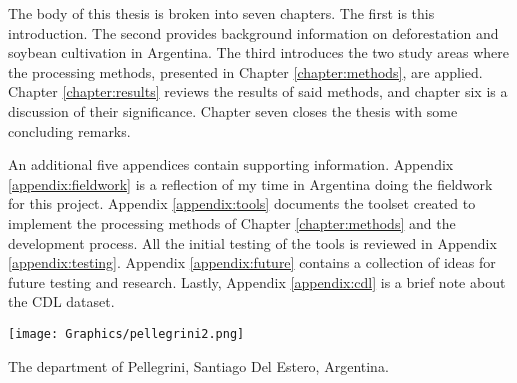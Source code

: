 The body of this thesis is broken into seven chapters. The first is this introduction. The second provides background information on deforestation and soybean cultivation in Argentina. The third introduces the two study areas where the processing methods, presented in Chapter \ref{chapter:methods}, are applied. Chapter \ref{chapter:results} reviews the results of said methods, and chapter six is a discussion of their significance. Chapter seven closes the thesis with some concluding remarks.

An additional five appendices contain supporting information. Appendix \ref{appendix:fieldwork} is a reflection of my time in Argentina doing the fieldwork for this project. Appendix \ref{appendix:tools} documents the toolset created to implement the processing methods of Chapter \ref{chapter:methods} and the development process. All the initial testing of the tools is reviewed in Appendix \ref{appendix:testing}. Appendix \ref{appendix:future} contains a collection of ideas for future testing and research. Lastly, Appendix \ref{appendix:cdl} is a brief note about the CDL dataset.

\begin{ssfigure}
  \centering
  \texttt{[image: Graphics/pellegrini2.png]}
  \caption{The department of Pellegrini, Santiago Del Estero, Argentina.}
  \label{fig:pellegrini}
\end{ssfigure}